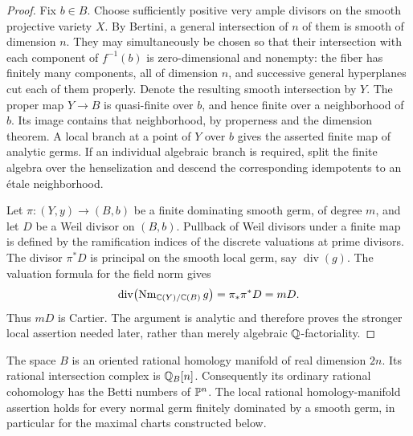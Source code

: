\begin{proof}
Fix $b\in B$.  Choose sufficiently positive very ample divisors on the
smooth projective variety $X$.  By Bertini, a general intersection of
$n$ of them is smooth of dimension $n$.  They may simultaneously be
chosen so that their intersection with each component of $f^{-1}(b)$
is zero-dimensional and nonempty: the fiber has finitely many
components, all of dimension $n$, and successive general hyperplanes
cut each of them properly.  Denote the resulting smooth intersection
by $Y$.  The proper map $Y\to B$ is quasi-finite over $b$, and hence
finite over a neighborhood of $b$.  Its image contains that
neighborhood, by properness and the dimension theorem.  A local
branch at a point of $Y$ over $b$ gives the asserted finite map of
analytic germs.  If an individual algebraic branch is required, split
the finite algebra over the henselization and descend the corresponding
idempotents to an \'etale neighborhood.

Let $\pi:(Y,y)\to (B,b)$ be a finite dominating smooth germ, of degree
$m$, and let $D$ be a Weil divisor on $(B,b)$.  Pullback of Weil
divisors under a finite map is defined by the ramification indices of
the discrete valuations at prime divisors.  The divisor $\pi^*D$ is
principal on the smooth local germ, say $\operatorname{div}(g)$.
The valuation formula for the field norm gives
\[
 \operatorname{div}\bigl(\operatorname{Nm}_{\mathbb C(Y)/\mathbb C(B)}g\bigr)
       =\pi_*\pi^*D=mD.
\]
Thus $mD$ is Cartier.  The argument is analytic and therefore proves
the stronger local assertion needed later, rather than merely
algebraic $\mathbb Q$-factoriality.
\end{proof}

\begin{proposition}
\label{loc:rational-smoothness}
The space $B$ is an oriented rational homology manifold of real
dimension $2n$.  Its rational intersection complex is
$\mathbb Q_B[n]$.  Consequently its ordinary rational cohomology has the
Betti numbers of $\mathbb P^n$.  The local rational homology-manifold
assertion holds for every normal germ finitely dominated by a smooth
germ, in particular for the maximal charts constructed below.
\end{proposition}

